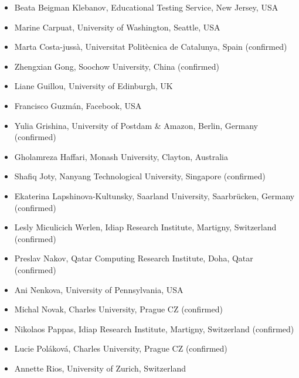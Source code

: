 \documentclass[11pt]{article}
\begin{document}
\begin{itemize} \setlength{\itemsep}{0pt}
\item Beata Beigman Klebanov, Educational Testing Service, New Jersey, USA
\item Marine Carpuat, University of Washington, Seattle, USA
\item Marta Costa-jussà, Universitat Politècnica de Catalunya, Spain (confirmed)
\item Zhengxian Gong, Soochow University, China (confirmed)
\item Liane Guillou, University of Edinburgh, UK
\item Francisco Guzm\'{a}n, Facebook, USA
\item Yulia Grishina, University of Postdam \& Amazon, Berlin, Germany (confirmed)
\item Gholamreza Haffari, Monash University, Clayton, Australia
\item Shafiq Joty, Nanyang Technological University, Singapore (confirmed)
\item Ekaterina Lapshinova-Kultunsky, Saarland University, Saarbrücken, Germany (confirmed)
\item Lesly Miculicich Werlen, Idiap Research Institute, Martigny, Switzerland (confirmed)
\item Preslav Nakov, Qatar Computing Research Institute, Doha, Qatar (confirmed)
\item Ani Nenkova, University of Pennsylvania, USA
\item Michal Novak, Charles University, Prague CZ (confirmed) %
\item Nikolaos Pappas, Idiap Research Institute, Martigny, Switzerland (confirmed)
\item Lucie Pol\'{a}kov\'{a}, Charles University, Prague CZ (confirmed)%
\item Annette Rios, University of Zurich, Switzerland

\end{itemize}
\end{document}

